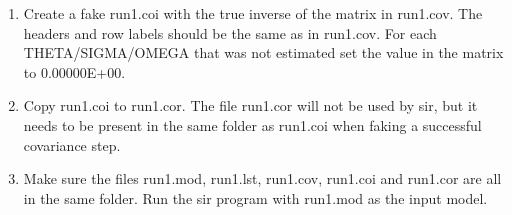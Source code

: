\begin{enumerate}
\item Create a fake run1.coi with the true inverse of the matrix in run1.cov. The headers and row labels should be the same as in run1.cov. For each THETA/SIGMA/OMEGA that was not estimated set the value in the matrix to 0.00000E+00. 
\item Copy run1.coi to run1.cor. The file run1.cor will not be used by sir, but it needs to be present in the same folder as run1.coi when faking a successful covariance step.
\item Make sure the files run1.mod, run1.lst, run1.cov, run1.coi and run1.cor are all in the same folder. Run the sir program with run1.mod as the input model. 
\end{enumerate}
